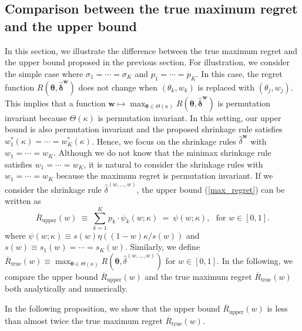 \documentclass[12pt,a4paper]{article}
\begin{document}
\subsection{Comparison between the true maximum regret and the upper bound}\label{SubSec:tightness}
In this section, we illustrate the difference between the true maximum regret and the upper bound proposed in the previous section. For illustration, we consider the simple case where $\sigma_1 = \cdots = \sigma_K$ and $p_1 = \cdots = p_K$. In this case, the regret function $R(\bm{\theta},\hat{\bm{\delta}}^{\bm{w}})$ does not change when $(\theta_k,w_k)$ is replaced with $(\theta_j, w_j)$. This implies that a function $\bm{w} \mapsto \max_{\bm{\theta} \in \Theta(\kappa)} R(\bm{\theta},\hat{\bm{\delta}}^{\bm{w}})$ is permutation invariant because $\Theta(\kappa)$ is permutation invariant. In this setting, our upper bound is also permutation invariant and the proposed shrinkage rule satisfies $w_1^{\ast}(\kappa) = \cdots = w_K^{\ast}(\kappa)$. Hence, we focus on the shrinkage rules $\hat{\delta}^{\bm{w}}$ with $w_1 = \cdots = w_K$. Although we do not know that the minimax shrinkage rule satisfies $w_1 = \cdots = w_K$, it is natural to consider the shrinkage rules with $w_1 = \cdots = w_K$ because the maximum regret is permutation invariant.
If we consider the shrinkage rule $\hat{\delta}^{(w,\ldots,w)}$, the upper bound (\ref{max_regret}) can be written as
\[
\overline{R}_{\mathrm{upper}}(w) \ \equiv \ \sum_{k=1}^K p_k \cdot \psi_k(w;\kappa) \ = \ \psi(w;\kappa), \ \ \ \text{for $w \in [0,1]$.}
\]
where $\psi(w;\kappa) \equiv s(w) \eta \left( (1-w)\kappa / s(w) \right)$ and $s(w) \equiv s_1(w) = \cdots = s_K(w)$. Similarly, we define $\overline{R}_{\mathrm{true}}(w) \equiv \max_{\bm{\theta} \in \Theta(\kappa)} R(\bm{\theta},\hat{\delta}^{(w,\ldots,w)})$ for $w \in [0,1]$. In the following, we compare the upper bound $\overline{R}_{\mathrm{upper}}(w)$ and the true maximum regret $\overline{R}_{\mathrm{true}}(w)$ both analytically and numerically.

In the following proposition, we show that the upper bound $\overline{R}_{\mathrm{upper}}(w)$ is less than almost twice the true maximum regret $\overline{R}_{\mathrm{true}}(w)$.
\end{document}
